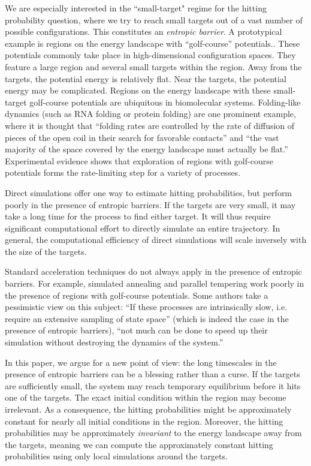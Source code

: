 \documentclass[english, aip, jcp, priprint, graphicx,floatfix]{revtex4-1}
\theoremstyle{plain}
\theoremstyle{definition}
\theoremstyle{plain}
\begin{document}
We are especially interested in the ``small-target" regime for the hitting probability question, where we try to reach small targets out of a vast number of possible configurations. This constitutes an \emph{entropic barrier}. A prototypical example is regions on the energy landscape with ``golf-course'' potentials.\cite{bicout2000entropic, Baum1986-we, Wille1987-tf}. These potentials commonly take place in high-dimensional configuration spaces. They feature a large region and several small targets within the region.  Away from the targets, the potential energy is relatively flat.  Near the targets, the potential energy may be complicated. Regions on the energy landscape with these small-target golf-course potentials are ubiquitous in biomolecular systems. Folding-like dynamics (such as RNA folding or protein folding) are one prominent example, where it is thought that ``folding rates are controlled by the rate of diffusion of pieces of the open coil in their search for favorable contacts'' and ``the vast majority of the space covered by the energy landscape must actually be flat.''\cite{McLeish2005-dq} Experimental evidence shows that exploration of regions with golf-course potentials forms the rate-limiting step for a variety of processes.\cite{Teschner1987-qs, Jacob1999-bs, Goldberg1999-mv, Plaxco1998-iv}

Direct simulations offer one way to estimate hitting probabilities, but perform poorly in the presence of entropic barriers. If the targets are very small, it may take a long time for the process to find either target.  It will thus require significant  computational effort to directly simulate an entire trajectory. In general, the computational efficiency of direct simulations will scale inversely with the size of the targets.

Standard acceleration techniques do not always apply in the presence of entropic barriers.  For example, simulated annealing and parallel tempering work poorly in the presence of regions with golf-course potentials.\cite{Baum1986-we, Wille1987-tf, Machta2009-gh} Some authors take a pessimistic view on this subject: ``If these processes are intrinsically slow, i.e. require an extensive sampling of state space'' (which is indeed the case in the presence of entropic barriers), ``not much can be done to speed up their simulation without destroying the dynamics of the system.''\cite{Christen2008-ge}

In this paper, we argue for a new point of view: the long timescales in the presence of entropic barriers can be a blessing rather than a curse.  If the targets are sufficiently small, the system may reach temporary equilibrium before it hits one of the targets. The exact initial condition within the region may become irrelevant. As a consequence, the hitting probabilities might be approximately constant for nearly all initial conditions in the region.  Moreover, the hitting probabilities may be approximately \emph{invariant} to the energy landscape away from the targets, meaning we can compute the approximately constant hitting probabilities using only local simulations around the targets.
\end{document}
